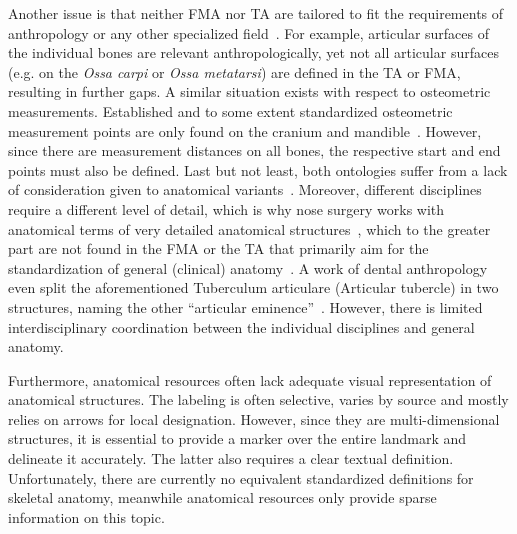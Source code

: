 \documentclass[sw]{iosart2x}
\begin{document}
Another issue is that neither FMA nor TA are tailored to fit the requirements of anthropology or any other specialized field~\citep{fma}.
For example, articular surfaces of the individual bones are relevant anthropologically, yet not all articular surfaces (e.g. on the \emph{Ossa carpi} or \emph{Ossa metatarsi}) are defined in the TA or FMA, resulting in further gaps.
A similar situation exists with respect to osteometric measurements.
Established and to some extent standardized osteometric measurement points are only found on the cranium and mandible~\citep{wesenanthropologie}.
 However, since there are measurement distances on all bones, the respective start and end points must also be defined.
Last but not least, both ontologies suffer from a lack of consideration given to anatomical variants~\citep{anatomycontribution}.
Moreover, different disciplines require a different level of detail, which is why nose surgery works with anatomical terms of very detailed anatomical structures~\citep{graysanatomy},
which to the greater part are not found in the FMA or the TA that primarily aim for the standardization of general (clinical) anatomy~\citep{fma}.
A work of dental anthropology even split the aforementioned Tuberculum articulare (Articular tubercle) in two structures, naming the other \enquote{articular eminence}~\citep{dentalanthropology}.
However, there is limited interdisciplinary coordination between the individual disciplines and general anatomy.

Furthermore, anatomical resources often lack adequate visual representation of anatomical structures.
The labeling is often selective, varies by source and mostly relies on arrows for local designation.
However, since they are multi-dimensional structures, it is essential to provide a marker over the entire landmark and delineate it accurately.
The latter also requires a clear textual definition.
Unfortunately, there are currently no equivalent standardized definitions for skeletal anatomy, meanwhile anatomical resources only provide sparse information on this topic.
\end{document}
